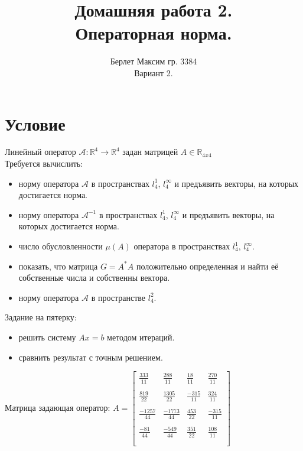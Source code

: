 \documentclass[a4paper]{article}
\author{Берлет Максим гр. 3384 \\ Вариант 2.}
\title{Домашняя работа 2. \\ Операторная норма.}
\date{}
\newcommand{\nicecolor}{blue!50!violet!50}
\begin{document}
\maketitle
\pagebreak

\tableofcontents
\pagebreak

\section{Условие}
\begin{tcolorbox}[title=Условие задания, colframe=\nicecolor, fonttitle=\bfseries]
    Линейный оператор $\mathcal{A} : \mathbb{R}^4 \rightarrow \mathbb{R}^4$ задан матрицей $A \in \mathbb{R}_{4x4}$ \\
    Требуется вычислить:
        \begin{itemize}
            \item норму оператора $\mathcal{A}$ в пространствах $l_{4}^{1}$, $l_{4}^{\infty}$ и предъявить векторы, на которых достигается норма.
            \item норму оператора $\mathcal{A}^{-1}$ в пространствах $l_{4}^{1}$, $l_{4}^{\infty}$ и предъявить векторы, на которых достигается норма.
            \item число обусловленности $\mu(A)$ оператора в пространствах $l_{4}^{1}$, $l_{4}^{\infty}$.
            \item показать, что матрица $G = A^{*}A$ положительно определенная и найти её собственные числа и собственны вектора.
            \item норму оператора $\mathcal{A}$ в пространстве $l_{4}^{2}$.
        \end{itemize}
    Задание на пятерку: 
    \begin{itemize}
        \item решить систему $Ax = b$ методом итераций.
        \item сравнить результат с точным решением.
    \end{itemize}
    \tcblower
    
    Матрица задающая оператор:
    $
    A = \begin{bmatrix}
    \frac{333}{11} & \frac{288}{11} & \frac{18}{11} & \frac{270}{11} \\\\
    \frac{819}{22} & \frac{1305}{22} & \frac{-315}{11} & \frac{324}{11} \\\\
    \frac{-1257}{44} & \frac{-1773}{44} & \frac{453}{22} & \frac{-315}{11} \\\\
    \frac{-81}{44} & \frac{-549}{44} & \frac{351}{22} & \frac{108}{11} \\\\
    \end{bmatrix}
    $
\end{tcolorbox}
\pagebreak
\end{document}

